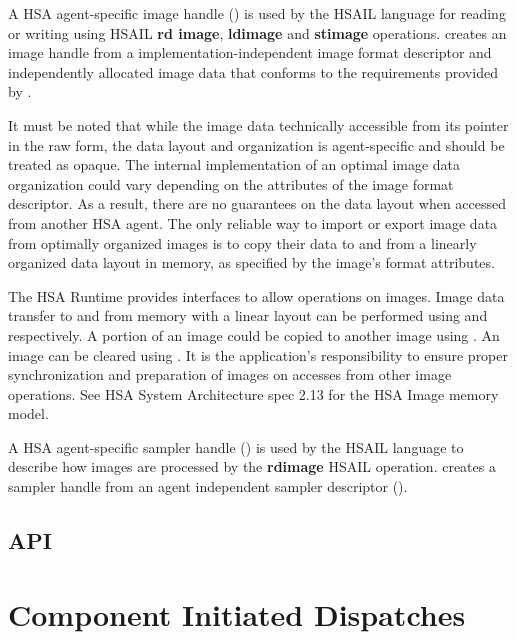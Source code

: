 \documentclass[final]{book}
\newcommand{\reffun}[1]{\textbf{#1}}
\newcommand{\refhsl}[1]{\reffun{#1}}
\begin{document}
A HSA agent-specific image handle () is used by
the HSAIL language for reading or writing using HSAIL \refhsl{rd image},
\refhsl{ldimage} and \refhsl{stimage}
operations.  creates an image handle from a
implementation-independent image format descriptor and independently allocated
image data that conforms to the requirements provided by
.

It must be noted that while the image data technically accessible from its
pointer in the raw form, the data layout and organization is agent-specific and
should be treated as opaque. The internal implementation of an optimal image
data organization could vary depending on the attributes of the image format
descriptor. As a result, there are no guarantees on the data layout when
accessed from another HSA agent. The only reliable way to import or export image
data from optimally organized images is to copy their data to and from a
linearly organized data layout in memory, as specified by the image's format
attributes.

The HSA Runtime provides interfaces to allow operations on images. Image data
transfer to and from memory with a linear layout can be performed using
 and  respectively. A
portion of an image could be copied to another image using
. An image can be cleared using
. It is the application's responsibility to ensure
proper synchronization and preparation of images on accesses from other image
operations. See HSA System Architecture spec 2.13 for the HSA Image memory
model.

A HSA agent-specific sampler handle () is used
by the HSAIL language to describe how images are processed by the
\refhsl{rdimage} HSAIL operation.  creates
a sampler handle from an agent independent sampler descriptor
().

\subsection{API}


\section{Component Initiated Dispatches} \label{architected}
\hypertarget{architectedchptr}{}
\end{document}
